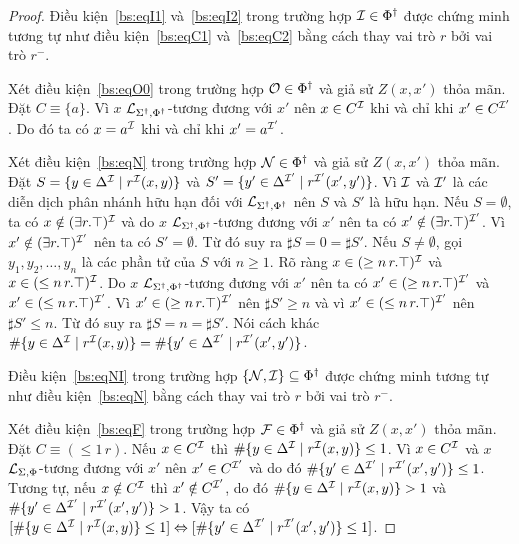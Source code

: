 \begin{proof}
	\semiItem Điều kiện~\eqref{bs:eqI1} và~\eqref{bs:eqI2} trong trường hợp $\mathcal{I} \in \Phi^\dag$ được chứng minh tương tự như điều kiện~\eqref{bs:eqC1} và~\eqref{bs:eqC2} bằng cách thay vai trò $r$ bởi vai trò $r^-$.
	
	\semiItem Xét điều kiện~\eqref{bs:eqO0} trong trường hợp $\mathcal{O} \in \Phi^\dag$ và giả sử $Z(x,x')$ thỏa mãn. Đặt $C \equiv \{a\}$. Vì $x$ $\mathcal{L}_{\Sigma^\dag,\Phi^\dag}$-tương đương với $x'$ nên $x \in C^{\mathcal{I}}$ khi và chỉ khi $x' \in C^{\mathcal{I}'}$. Do đó ta có $x = a^{\mathcal{I}}$ khi và chỉ khi $x' = a^{\mathcal{I}'}$.
	
	\semiItem Xét điều kiện~\eqref{bs:eqN} trong trường hợp $\mathcal{N} \in \Phi^\dag$ và giả sử $Z(x,x')$ thỏa mãn. Đặt $S = \{y \in \Delta^{\mathcal{I}} \mid r^{\mathcal{I}}(x,y)\}$ và $S' = \{y' \in \Delta^{\mathcal{I}'} \mid r^{\mathcal{I}'}(x',y')\}$. Vì $\mathcal{I}$ và $\mathcal{I}'$ là các diễn dịch phân nhánh hữu hạn đối với $\mathcal{L}_{\Sigma^\dag,\Phi^\dag}$ nên $S$ và $S'$ là hữu hạn. Nếu $S=\emptyset$, ta có $x \notin (\exists r.\top)^{\mathcal{I}}$ và do $x$ $\mathcal{L}_{\Sigma^\dag,\Phi^\dag}$-tương đương với $x'$ nên ta có $x' \notin (\exists r.\top)^{\mathcal{I}'}$. Vì $x' \notin (\exists r.\top)^{\mathcal{I}'}$ nên ta có $S' = \emptyset$. Từ đó suy ra $\sharp S = 0 = \sharp S'$. Nếu $S \not= \emptyset$, gọi $y_1, y_2, \ldots, y_n$ là các phần tử của $S$ với $n \geq 1$. Rõ ràng $x \in (\geq n\,r.\top)^{\mathcal{I}}$ và $x \in (\leq n\,r.\top)^{\mathcal{I}}$. Do $x$ $\mathcal{L}_{\Sigma^\dag,\Phi^\dag}$-tương đương với $x'$ nên ta có $x' \in (\geq n\,r.\top)^{\mathcal{I}'}$ và $x' \in (\leq n\,r.\top)^{\mathcal{I}'}$. Vì $x' \in (\geq n\,r.\top)^{\mathcal{I}'}$ nên $\sharp S' \geq n$ và vì $x' \in (\leq n\,r.\top)^{\mathcal{I}'}$ nên $\sharp S' \leq n$. Từ đó suy ra $\sharp S = n = \sharp S'$. Nói cách khác $\#\{y \in \Delta^{\mathcal{I}} \mid r^{\mathcal{I}}(x,y)\} = \#\{y' \in \Delta^{\mathcal{I}'} \mid r^{\mathcal{I}'}(x',y')\}$.
	
	\semiItem Điều kiện~\eqref{bs:eqNI} trong trường hợp $\{\mathcal{N},\mathcal{I}\} \subseteq \Phi^\dag$ được chứng minh tương tự như điều kiện~\eqref{bs:eqN} bằng cách thay vai trò $r$ bởi vai trò $r^-$.
	
	\semiItem Xét điều kiện~\eqref{bs:eqF} trong trường hợp $\mathcal{F} \in \Phi^\dag$ và giả sử $Z(x,x')$ thỏa mãn. Đặt $C \equiv (\leq\!1\,r)$. Nếu $x \in C^{\mathcal{I}}$ thì $\#\{y \in \Delta^{\mathcal{I}} \mid r^{\mathcal{I}}(x,y)\} \leq 1$. Vì $x \in C^{\mathcal{I}}$ và $x$ $\mathcal{L}_{\Sigma,\Phi}$-tương đương với $x'$ nên $x' \in C^{\mathcal{I}'}$ và do đó $\#\{y' \in \Delta^{\mathcal{I}'} \mid r^{\mathcal{I}'}(x',y')\} \leq 1$. Tương tự, nếu $x \notin C^{\mathcal{I}}$ thì $x' \notin C^{\mathcal{I}'}$, do đó $\#\{y \in \Delta^{\mathcal{I}} \mid r^{\mathcal{I}}(x,y)\} > 1$ và $\#\{y' \in \Delta^{\mathcal{I}'} \mid r^{\mathcal{I}'}(x',y')\} > 1$. Vậy ta có $[\#\{y \in \Delta^{\mathcal{I}} \mid r^{\mathcal{I}}(x,y)\} \leq 1] \Leftrightarrow [\#\{y' \in \Delta^{\mathcal{I}'} \mid r^{\mathcal{I}'}(x',y')\} \leq 1]$.
	

\end{proof}
